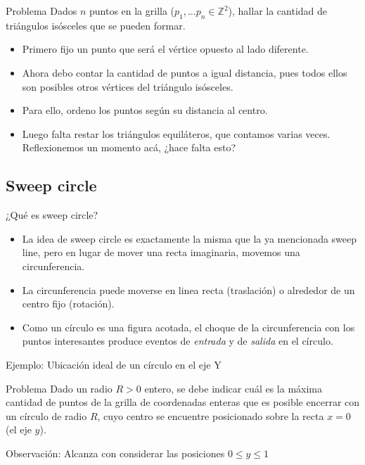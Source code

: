 \documentclass[compress]{beamer}
\begin{document}
\begin{frame}

\begin{block}{Problema}
Dados $n$ puntos en la grilla ($p_1, \ldots p_n \in \mathbb{Z}^2$), 
hallar la cantidad de triángulos isósceles que se pueden formar.
\end{block}

\end{frame}

\begin{frame}

\begin{itemize}
\item Primero fijo un punto que será el vértice opuesto al lado diferente.
\item Ahora debo contar la cantidad de puntos a igual distancia, pues
todos ellos son posibles otros vértices del triángulo isósceles.
\item Para ello, ordeno los puntos según su distancia al centro.
\item Luego falta restar los triángulos equiláteros, que contamos varias
veces. Reflexionemos un momento acá, ¿hace falta esto?
\end{itemize}
\end{frame}

\subsection{Sweep circle}

\begin{frame}{¿Qu\'e es sweep circle?}
\begin{itemize}
\item La idea de sweep circle es exactamente la misma que la ya mencionada sweep line, pero en lugar de mover una recta imaginaria, movemos una circunferencia.

\item La circunferencia puede moverse en linea recta (traslación) o alrededor de un centro fijo (rotación).

\item Como un círculo es una figura acotada, el choque de la circunferencia con los puntos interesantes produce eventos de \textit{entrada} y de \textit{salida} en el círculo.
\end{itemize}
\end{frame}

\begin{frame}{Ejemplo: Ubicación ideal de un círculo en el eje Y}

\begin{block}{Problema}
    Dado un radio $R > 0$ entero, se debe indicar cuál es la máxima cantidad de puntos de la grilla de coordenadas enteras que es posible encerrar con un círculo de radio $R$, cuyo centro se encuentre posicionado sobre la recta $x=0$ (el eje $y$).
\end{block}

\pause
{}
{
    Observación: Alcanza con considerar las posiciones $0 \leq y \leq 1$
}

\end{frame}
\end{document}
